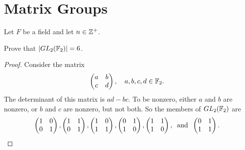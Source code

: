 \section{Matrix Groups}

Let $F$ be a field and let $n\in\mathbb{Z}^+$.

 Prove that $\lvert{GL_2(\mathbb{F}_2)}\rvert = 6$.
\begin{proof}
  Consider the matrix
  \begin{equation*}
    \begin{pmatrix}
      a & b \\
      c & d
    \end{pmatrix},
    \quad a,b,c,d\in\mathbb{F}_2.
  \end{equation*}
  The determinant of this matrix is $ad-bc$. To be nonzero, either $a$
  and $b$ are nonzero, or $b$ and $c$ are nonzero, but not both. So
  the members of $GL_2(\mathbb{F}_2)$ are
  \begin{equation*}
    \begin{pmatrix}
      1 & 0 \\
      0 & 1
    \end{pmatrix},
    \begin{pmatrix}
      1 & 1 \\
      0 & 1
    \end{pmatrix},
    \begin{pmatrix}
      1 & 0 \\
      1 & 1
    \end{pmatrix},
    \begin{pmatrix}
      0 & 1 \\
      1 & 0
    \end{pmatrix},
    \begin{pmatrix}
      1 & 1 \\
      1 & 0
    \end{pmatrix},
    \;\;\text{and}\;\;
    \begin{pmatrix}
      0 & 1 \\
      1 & 1
    \end{pmatrix}. \qedhere
  \end{equation*}
\end{proof}

